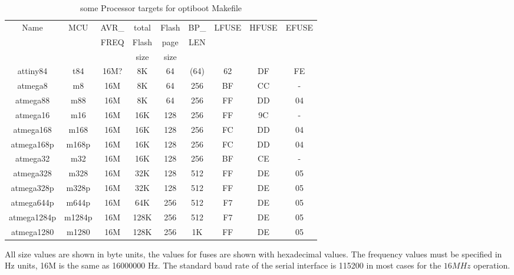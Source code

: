\begin{table}[H]
  \begin{center}
    \begin{tabular}{| c | c | c | c | c | c | c | c | c |}
    \hline
             Name  & MCU & AVR\_ & total & Flash & BP\_ & LFUSE & HFUSE & EFUSE  \\
                   &     & FREQ  & Flash & page  & LEN  &       &       &        \\
                   &     &       &  size & size  &      &       &       &        \\
    \hline
    \hline
         attiny84 & t84   & 16M? &  8K   &  64   & (64) &  62   &  DF   & FE \\
    \hline
         atmega8  & m8    & 16M  &  8K   &  64   & 256  &  BF   &  CC   &  - \\
    \hline
         atmega88 & m88   & 16M  &  8K   &  64   & 256  &  FF   &  DD   &  04 \\
    \hline
       atmega16   & m16   & 16M  &  16K  & 128   & 256  &  FF   &  9C   &  - \\
    \hline
       atmega168  &  m168  & 16M  &  16K & 128   & 256  &  FC   &  DD   &  04 \\
       atmega168p &  m168p & 16M  &  16K & 128   & 256  &  FC   &  DD   &  04 \\
    \hline
       atmega32   &  m32   & 16M  &  16K & 128   & 256  &  BF   &  CE   &  - \\
    \hline
       atmega328  &  m328  & 16M  &  32K & 128   & 512  &  FF   &  DE   &  05 \\
       atmega328p & m328p & 16M  &  32K  & 128   & 512  &  FF   &  DE   &  05 \\
    \hline
       atmega644p & m644p & 16M  &  64K  & 256   & 512  &  F7   &  DE   &  05 \\
    \hline
     atmega1284p & m1284p & 16M  & 128K  & 256   & 512  &  F7   &  DE   &  05 \\
    \hline
     atmega1280  & m1280  & 16M  &  128K & 256   & 1K   &  FF   &  DE   &  05 \\
    \hline
    \end{tabular}
  \end{center}
  \caption{some Processor targets for optiboot Makefile}
  \label{tab:processors}
\end{table}

All size values are shown in byte units, the values for fuses are shown with hexadecimal values.
The frequency values must be specified in Hz units, 16M is the same as 16000000 Hz.
The standard baud rate of the serial interface is 115200 in most cases for the \(16 MHz\) operation.

